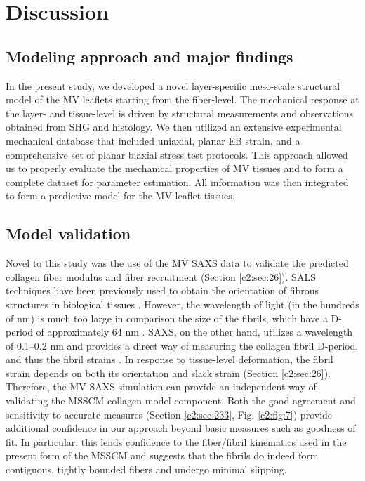 \section{Discussion}

\subsection{Modeling approach and major findings}

    In the present study, we developed a novel layer-specific meso-scale structural model of the MV leaflets starting from the fiber-level. The mechanical response at the layer- and tissue-level is driven by structural measurements and observations obtained from SHG and histology. We then utilized an extensive experimental mechanical database that included uniaxial, planar EB strain, and a comprehensive set of planar biaxial stress test protocols. This approach allowed us to properly evaluate the mechanical properties of MV tissues and to form a complete dataset for parameter estimation. All information was then integrated to form a predictive model for the MV leaflet tissues.
    
    
\subsection{Model validation}

    Novel to this study was the use of the MV SAXS data \cite{liao_relation_2007} to validate the predicted collagen fiber modulus and fiber recruitment (Section \ref{c2:sec:26}). SALS techniques have been previously used to obtain the orientation of fibrous structures in biological tissues \cite{sacks_small_1997}. However, the wavelength of light (in the hundreds of nm) is much too large in comparison the size of the fibrils, which have a D-period of approximately 64 nm \cite{kastelic_structural_1980,hodge_recent_1963,chapman_electron_1984}. SAXS, on the other hand, utilizes a wavelength of 0.1–0.2 nm and provides a direct way of measuring the collagen fibril D-period, and thus the fibril strains \cite{sasaki_elongation_1996,sasaki_stress_1996,liao_relation_2007}. In response to tissue-level deformation, the fibril strain depends on both its orientation and slack strain (Section \ref{c2:sec:26}). Therefore, the MV SAXS simulation can provide an independent way of validating the MSSCM collagen model component. Both the good agreement and sensitivity to accurate measures (Section \ref{c2:sec:233}, Fig. \ref{c2:fig:7}) provide additional confidence in our approach beyond basic measures such as goodness of fit. In particular, this lends confidence to the fiber/fibril kinematics used in the present form of the MSSCM and suggests that the fibrils do indeed form contiguous, tightly bounded fibers and undergo minimal slipping.
    
